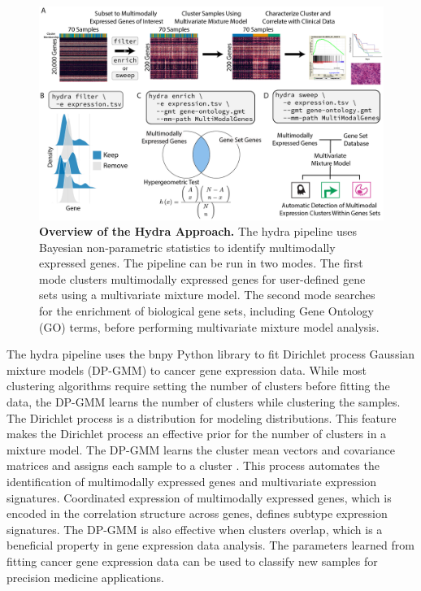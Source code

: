 \documentclass[10pt,letterpaper]{article}
\begin{document}
\begin{figure}[h!]
	\includegraphics[width=\textwidth]{"img/overview-fig"}
\caption{{\bf Overview of the Hydra Approach.}
		The hydra pipeline uses Bayesian non-parametric statistics to identify multimodally expressed genes. The pipeline can be run in two modes. The first mode clusters multimodally expressed genes for user-defined gene sets using a multivariate mixture model. The second mode searches for the enrichment of biological gene sets, including Gene Ontology (GO) terms, before performing multivariate mixture model analysis.
		\label{overview}}
\end{figure}

The hydra pipeline uses the bnpy Python library to fit Dirichlet process Gaussian mixture models (DP-GMM) to cancer gene expression data. While most clustering algorithms require setting the number of clusters before fitting the data, the DP-GMM learns the number of clusters while clustering the samples. The Dirichlet process is a distribution for modeling distributions. This feature makes the Dirichlet process an effective prior for the number of clusters in a mixture model. The DP-GMM learns the cluster mean vectors and covariance matrices and assigns each sample to a cluster \cite{hughesBnpyReliableScalable}. This process automates the identification of multimodally expressed genes and multivariate expression signatures. Coordinated expression of multimodally expressed genes, which is encoded in the correlation structure across genes, defines subtype expression signatures. The DP-GMM is also effective when clusters overlap, which is a beneficial property in gene expression data analysis. The parameters learned from fitting cancer gene expression data can be used to classify new samples for precision medicine applications.
 
\end{document}
